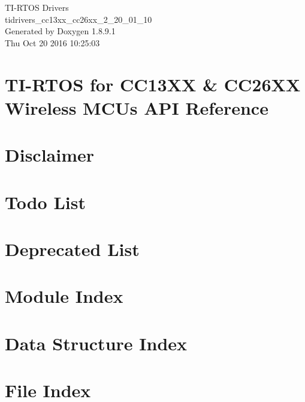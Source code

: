 \documentclass[twoside]{article}
\newcommand{\+}{\discretionary{\mbox{\scriptsize$\hookleftarrow$}}{}{}}
\begin{document}
\begin{titlepage}
\vspace*{7cm}
\begin{center}%
{\Large T\+I-\/\+R\+T\+O\+S Drivers \\[1ex]\large tidrivers\+\_\+cc13xx\+\_\+cc26xx\+\_\+2\+\_\+20\+\_\+01\+\_\+10 }\\
\vspace*{1cm}
{\large Generated by Doxygen 1.8.9.1}\\
\vspace*{0.5cm}
{\small Thu Oct 20 2016 10:25:03}\\
\end{center}
\end{titlepage}
\tableofcontents
{}

\section{T\+I-\/\+R\+T\+O\+S for C\+C13\+X\+X \& C\+C26\+X\+X Wireless M\+C\+Us A\+P\+I Reference}
\label{index}\hypertarget{index}{}
\section{Disclaimer}
\label{_disclaimer}

\section{Todo List}
\label{todo}

\section{Deprecated List}
\label{deprecated}

\section{Module Index}

\section{Data Structure Index}

\section{File Index}

\end{document}
